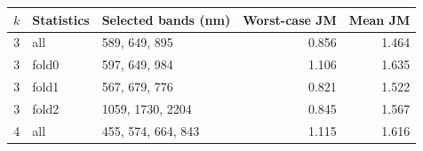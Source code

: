 \begin{tabular}{rllrr}
\toprule
$k$ & Statistics & Selected bands (nm) & Worst-case JM & Mean JM \\
\midrule
3 & all & 589, 649, 895 & 0.856 & 1.464 \\
3 & fold0 & 597, 649, 984 & 1.106 & 1.635 \\
3 & fold1 & 567, 679, 776 & 0.821 & 1.522 \\
3 & fold2 & 1059, 1730, 2204 & 0.845 & 1.567 \\
4 & all & 455, 574, 664, 843 & 1.115 & 1.616 \\
\bottomrule
\end{tabular}
